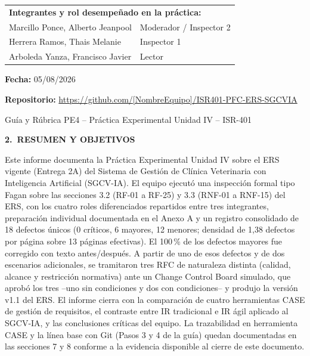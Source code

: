 \documentclass[11pt,a4paper]{article}
\newcommand{\seccion}[2]{%
  \vspace{0.6cm}
  \noindent
  {\color{white}\colorbox{uteqverde}{%
    \parbox[c][1.05cm]{\dimexpr\textwidth-16pt\relax}{%
      \hspace{6pt}\textbf{\large #1\ #2}%
    }%
  }}%
  \vspace{0.35cm}
  \par
}
\newcommand{\subseccion}[1]{%
  \vspace{0.35cm}
  \noindent{\color{uteqverde}\textbf{\large #1}}\par
  \vspace{0.15cm}
}
\begin{document}
\begin{titlepage}
\vspace{1cm}

\begin{tabular}{ll}
\multicolumn{2}{l}{\textbf{Integrantes y rol desempeñado en la práctica:}}\\[4pt]
Marcillo Ponce, Alberto Jeanpool & Moderador / Inspector 2 \\
Herrera Ramos, Thais Melanie & Inspector 1 \\
Arboleda Yanza, Francisco Javier & Lector \\
\end{tabular}

\vspace{1.2cm}

\textbf{Fecha:} 05/08/2026

\vspace{0.6cm}

\textbf{Repositorio:} \url{https://github.com/[NombreEquipo]/ISR401-PFC-ERS-SGCVIA}

\vfill
{\small Guía y Rúbrica PE4 -- Práctica Experimental Unidad IV -- ISR-401}
\end{titlepage}

\seccion{2.}{RESUMEN Y OBJETIVOS}

\subseccion{Resumen}
Este informe documenta la Práctica Experimental Unidad IV sobre el ERS vigente
(Entrega 2A) del Sistema de Gestión de Clínica Veterinaria con Inteligencia
Artificial (SGCV-IA). El equipo ejecutó una inspección formal tipo Fagan sobre
las secciones 3.2 (RF-01 a RF-25) y 3.3 (RNF-01 a RNF-15) del ERS, con los
cuatro roles diferenciados repartidos entre tres integrantes, preparación
individual documentada en el Anexo A y un registro consolidado de 18 defectos
únicos (0 críticos, 6 mayores, 12 menores; densidad de 1,38 defectos por
página sobre 13 páginas efectivas). El 100\,\% de los defectos mayores fue
corregido con texto antes/después. A partir de uno de esos defectos y de dos
escenarios adicionales, se tramitaron tres RFC de naturaleza distinta (calidad,
alcance y restricción normativa) ante un Change Control Board simulado, que
aprobó los tres --uno sin condiciones y dos con condiciones-- y produjo la
versión v1.1 del ERS. El informe cierra con la comparación de cuatro
herramientas CASE de gestión de requisitos, el contraste entre IR tradicional
e IR ágil aplicado al SGCV-IA, y las conclusiones críticas del equipo. La
trazabilidad en herramienta CASE y la línea base con Git (Pasos 3 y 4 de la
guía) quedan documentadas en las secciones 7 y 8 conforme a la evidencia
disponible al cierre de este documento.
\end{document}
